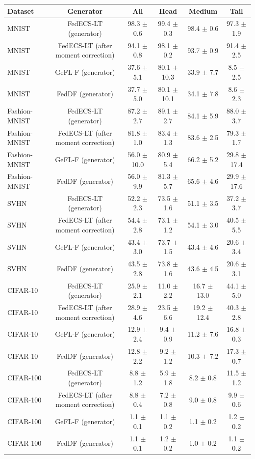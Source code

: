 \begin{tabular}{lccccc}
\toprule
Dataset & Generator & All & Head & Medium & Tail\\
\midrule
MNIST & FedECS-LT (generator) & 98.3 $\pm$ 0.6 & 99.4 $\pm$ 0.3 & 98.4 $\pm$ 0.6 & 97.3 $\pm$ 1.9\\
MNIST & FedECS-LT (after moment correction) & 94.1 $\pm$ 0.8 & 98.1 $\pm$ 0.2 & 93.7 $\pm$ 0.9 & 91.4 $\pm$ 2.5\\
MNIST & GeFL-F (generator) & 37.6 $\pm$ 5.1 & 80.1 $\pm$ 10.3 & 33.9 $\pm$ 7.7 & 8.5 $\pm$ 2.5\\
MNIST & FedDF (generator) & 37.7 $\pm$ 5.0 & 80.1 $\pm$ 10.1 & 34.1 $\pm$ 7.8 & 8.6 $\pm$ 2.3\\
Fashion-MNIST & FedECS-LT (generator) & 87.2 $\pm$ 2.7 & 89.1 $\pm$ 2.7 & 84.1 $\pm$ 5.9 & 88.0 $\pm$ 3.7\\
Fashion-MNIST & FedECS-LT (after moment correction) & 81.8 $\pm$ 1.0 & 83.4 $\pm$ 1.3 & 83.6 $\pm$ 2.5 & 79.3 $\pm$ 1.7\\
Fashion-MNIST & GeFL-F (generator) & 56.0 $\pm$ 10.0 & 80.9 $\pm$ 5.4 & 66.2 $\pm$ 5.2 & 29.8 $\pm$ 17.4\\
Fashion-MNIST & FedDF (generator) & 56.0 $\pm$ 9.9 & 81.3 $\pm$ 5.7 & 65.6 $\pm$ 4.6 & 29.9 $\pm$ 17.6\\
SVHN & FedECS-LT (generator) & 52.2 $\pm$ 2.3 & 73.5 $\pm$ 1.6 & 51.1 $\pm$ 3.5 & 37.2 $\pm$ 3.7\\
SVHN & FedECS-LT (after moment correction) & 54.4 $\pm$ 2.8 & 73.1 $\pm$ 1.2 & 54.1 $\pm$ 3.0 & 40.5 $\pm$ 5.5\\
SVHN & GeFL-F (generator) & 43.4 $\pm$ 3.0 & 73.7 $\pm$ 1.5 & 43.4 $\pm$ 4.6 & 20.6 $\pm$ 3.4\\
SVHN & FedDF (generator) & 43.5 $\pm$ 2.8 & 73.8 $\pm$ 1.6 & 43.6 $\pm$ 4.5 & 20.6 $\pm$ 3.1\\
CIFAR-10 & FedECS-LT (generator) & 25.9 $\pm$ 2.1 & 11.0 $\pm$ 2.2 & 16.7 $\pm$ 13.0 & 44.1 $\pm$ 5.0\\
CIFAR-10 & FedECS-LT (after moment correction) & 28.9 $\pm$ 4.6 & 23.5 $\pm$ 6.6 & 19.2 $\pm$ 12.4 & 40.3 $\pm$ 2.8\\
CIFAR-10 & GeFL-F (generator) & 12.9 $\pm$ 2.4 & 9.4 $\pm$ 0.9 & 11.2 $\pm$ 7.6 & 16.8 $\pm$ 0.3\\
CIFAR-10 & FedDF (generator) & 12.8 $\pm$ 2.2 & 9.2 $\pm$ 1.2 & 10.3 $\pm$ 7.2 & 17.3 $\pm$ 0.7\\
CIFAR-100 & FedECS-LT (generator) & 8.8 $\pm$ 1.2 & 5.9 $\pm$ 1.8 & 8.2 $\pm$ 0.8 & 11.5 $\pm$ 1.2\\
CIFAR-100 & FedECS-LT (after moment correction) & 8.8 $\pm$ 0.4 & 7.2 $\pm$ 0.8 & 9.0 $\pm$ 0.8 & 9.9 $\pm$ 0.6\\
CIFAR-100 & GeFL-F (generator) & 1.1 $\pm$ 0.1 & 1.1 $\pm$ 0.2 & 1.1 $\pm$ 0.2 & 1.2 $\pm$ 0.2\\
CIFAR-100 & FedDF (generator) & 1.1 $\pm$ 0.1 & 1.2 $\pm$ 0.2 & 1.0 $\pm$ 0.2 & 1.1 $\pm$ 0.2\\
\bottomrule
\end{tabular}
